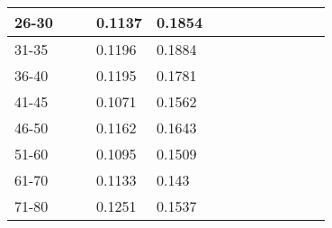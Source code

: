 \begin{table*}[]
\begin{tabular}{|l|l|l|l|l|l|l|l|l|l|l|l|l|}
        26-30   &                                &                                & 0.1137                         & 0.1854                         &                                &                                &         &           &         &           &         &           \\ \hline
        31-35   &                                &                                & 0.1196                         & 0.1884                         &                                &                                &         &           &         &           &         &           \\ \hline
        36-40   &                                &                                & 0.1195                         & 0.1781                         &                                &                                &         &           &         &           &         &           \\ \hline
        41-45   &                                &                                & 0.1071                         & 0.1562                         &                                &                                &         &           &         &           &         &           \\ \hline
        46-50   &                                &                                & 0.1162                         & 0.1643                         &                                &                                &         &           &         &           &         &           \\ \hline
        51-60   &                                &                                & 0.1095                         & 0.1509                         &                                &                                &         &           &         &           &         &           \\ \hline
        61-70   &                                &                                & 0.1133                         & 0.143                          &                                &                                &         &           &         &           &         &           \\ \hline
        71-80   &                                &                                & 0.1251                         & 0.1537                         &                                &                                &         &           &         &           &         &           \\ \hline

\end{tabular}
\end{table*}
